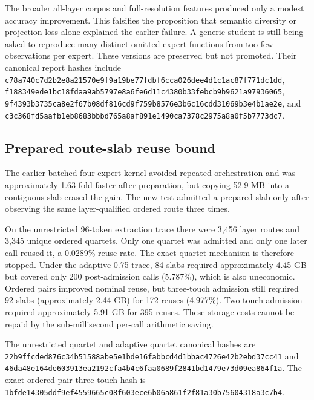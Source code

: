 The broader all-layer corpus and full-resolution features produced only a modest
accuracy improvement.  This falsifies the proposition that semantic diversity
or projection loss alone explained the earlier failure.  A generic student is
still being asked to reproduce many distinct omitted expert functions from too
few observations per expert.  These versions are preserved but not promoted.
Their canonical report hashes include
\texttt{c78a740c7d2b2e8a21570e9f9a19be7}\allowbreak\texttt{7fdbf6cca026dee4d1c1ac87f771dc1dd},
\texttt{f188349ede1bc18fdaa9ab5797e8a6fe}\allowbreak\texttt{6d11c4380b33febcb9b9621a97936065},
\texttt{9f4393b3735ca8e2f67b08df816cd9f}\allowbreak\texttt{759b8576e3b6c16cdd31069b3e4b1ae2e},
and
\texttt{c3c368fd5aafb1eb8683bbbd765a8af8}\allowbreak\texttt{91e1490ca7378c2975a8a0f5b7773dc7}.

\subsection{Prepared route-slab reuse bound}

The earlier batched four-expert kernel avoided repeated orchestration and was
approximately 1.63-fold faster after preparation, but copying 52.9 MB into a
contiguous slab erased the gain.  The new test admitted a prepared slab only
after observing the same layer-qualified ordered route three times.

On the unrestricted 96-token extraction trace there were 3,456 layer routes and
3,345 unique ordered quartets.  Only one quartet was admitted and only one later
call reused it, a 0.0289\% reuse rate.  The exact-quartet mechanism is therefore
stopped.  Under the adaptive-0.75 trace, 84 slabs required approximately 4.45 GB
but covered only 200 post-admission calls (5.787\%), which is also uneconomic.
Ordered pairs improved nominal reuse, but three-touch admission still required
92 slabs (approximately 2.44 GB) for 172 reuses (4.977\%).  Two-touch admission
required approximately 5.91 GB for 395 reuses.  These storage costs cannot be
repaid by the sub-millisecond per-call arithmetic saving.

The unrestricted quartet and adaptive quartet canonical hashes are
\texttt{22b9ffcded876c34b51588abe5e1bde1}\allowbreak\texttt{6fabbcd4d1bbac4726e42b2ebd37cc41}
and
\texttt{46da48e164de603913ea2192cfa4b4c6}\allowbreak\texttt{faa0689f2841bd1479e73d09ea864f1a}.
The exact ordered-pair three-touch hash is
\texttt{1bfde14305ddf9ef4559665c08f603ec}\allowbreak\texttt{e6b06a861f2f81a30b75604318a3c7b4}.

